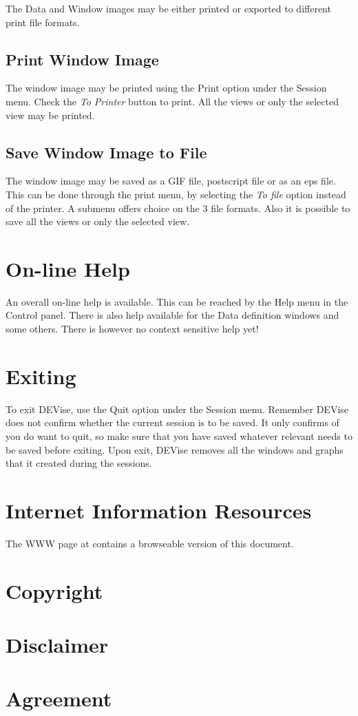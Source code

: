 The Data and Window images may be either printed or exported to  different print file formats. 

\subsection{Print Window Image}

The window image may be printed using the Print option under the Session menu. Check the {\em To Printer } button to print. All the views or only the selected view may be printed.

\subsection{Save Window Image to File}

The window image may be saved as a GIF file, postscript file or as an eps file. This can be done through the print menu, by selecting the {\em To file }option instead of the printer. A submenu offers choice on the 3 file formats. Also it is possible to save all the views or only the selected view.

\section{On-line Help}

An overall on-line help is available. This can be reached by the Help menu in the Control panel. There is also help available for the Data definition windows and some others. There is however no context sensitive help yet! 

\section{Exiting \Devise}

To exit DEVise, use the Quit option under the Session menu. Remember DEVise does not confirm whether the current session is to be saved. It only confirms of you do want to quit, so make sure that you have saved whatever relevant needs to be saved before exiting. Upon exit, DEVise removes all the windows and graphs that it created during the sessions.

\section{Internet Information Resources}

The \Devise WWW page at
 contains a browseable
version of this document.
\newpage 
\section*{Copyright}



\section*{Disclaimer}



\newpage
\section*{Agreement}




